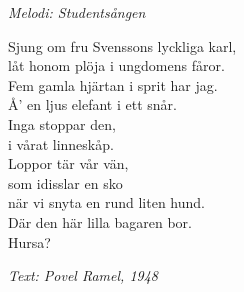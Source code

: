 {\footnotesize\textit{Melodi: Studentsången}}\par
\vspace{10pt}
Sjung om fru Svenssons lyckliga karl,\\
låt honom plöja i ungdomens fåror.\\
Fem gamla hjärtan i sprit har jag.\\
Å' en ljus elefant i ett snår.\\
Inga stoppar den,\\
i vårat linneskåp.\\
Loppor tär vår vän,\\
som idisslar en sko\\
när vi snyta en rund liten hund.\\
\revrpt Där den här lilla bagaren bor.\rpt\\
Hursa?\par
\vspace{10pt}
{\footnotesize\textit{Text: Povel Ramel, 1948}}
